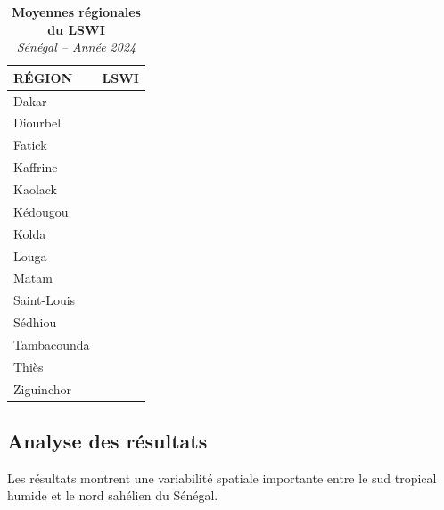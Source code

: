 \documentclass[
]{book}
\begin{document}
\begin{table}[!t]
\caption*{
{\large \textbf{Moyennes régionales du LSWI}} \\ 
{\small \emph{Sénégal -- Année 2024}}
} 
\fontsize{12.0pt}{14.4pt}\selectfont
\begin{tabular*}{\linewidth}{@{\extracolsep{\fill}}lr}
\toprule
{RÉGION} & {LSWI} \\ 
\midrule\addlinespace[2.5pt]
Dakar & {\cellcolor[HTML]{DCEAF6}{\textcolor[HTML]{000000}{-0.118}}} \\ 
Diourbel & {\cellcolor[HTML]{F7FBFF}{\textcolor[HTML]{000000}{-0.157}}} \\ 
Fatick & {\cellcolor[HTML]{B2D2E8}{\textcolor[HTML]{000000}{-0.065}}} \\ 
Kaffrine & {\cellcolor[HTML]{E6F0F9}{\textcolor[HTML]{000000}{-0.132}}} \\ 
Kaolack & {\cellcolor[HTML]{EFF6FC}{\textcolor[HTML]{000000}{-0.145}}} \\ 
Kédougou & {\cellcolor[HTML]{DBE9F6}{\textcolor[HTML]{000000}{-0.116}}} \\ 
Kolda & {\cellcolor[HTML]{BBD6EB}{\textcolor[HTML]{000000}{-0.074}}} \\ 
Louga & {\cellcolor[HTML]{EDF5FC}{\textcolor[HTML]{000000}{-0.142}}} \\ 
Matam & {\cellcolor[HTML]{DCE9F6}{\textcolor[HTML]{000000}{-0.117}}} \\ 
Saint-Louis & {\cellcolor[HTML]{D7E6F5}{\textcolor[HTML]{000000}{-0.110}}} \\ 
Sédhiou & {\cellcolor[HTML]{6EAFD7}{\textcolor[HTML]{000000}{-0.013}}} \\ 
Tambacounda & {\cellcolor[HTML]{DAE8F6}{\textcolor[HTML]{000000}{-0.115}}} \\ 
Thiès & {\cellcolor[HTML]{EBF3FB}{\textcolor[HTML]{000000}{-0.140}}} \\ 
Ziguinchor & {\cellcolor[HTML]{08306B}{\textcolor[HTML]{FFFFFF}{0.135}}} \\ 
\bottomrule
\end{tabular*}
\end{table}

\subsection{Analyse des résultats}\label{analyse-des-ruxe9sultats-2}

Les résultats montrent une variabilité spatiale importante entre le sud tropical humide et le nord sahélien du Sénégal.
\end{document}
